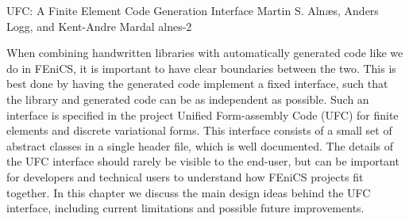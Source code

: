               {UFC: A Finite Element Code Generation Interface}
              {Martin S. Aln\ae{}s, Anders Logg, and Kent-Andre Mardal}
              {alnes-2}

When combining handwritten libraries with automatically generated
code like we do in FEniCS, it is important to have clear boundaries
between the two.  This is best done by having the generated code
implement a fixed interface, such that the library and generated code
can be as independent as possible.  Such an interface is specified in
the project Unified Form-assembly Code (UFC) for finite elements and
discrete variational forms. This interface consists of a small set of
abstract classes in a single header file, which is well documented.
The details of the UFC interface should rarely be visible to the
end-user, but can be important for developers and technical users to
understand how FEniCS projects fit together. In this chapter we
discuss the main design ideas behind the UFC interface, including
current limitations and possible future improvements.
